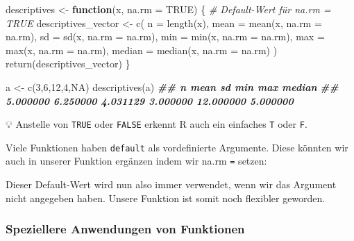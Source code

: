 \documentclass[
]{article}
\newenvironment{Shaded}{\begin{snugshade}}{\end{snugshade}}
\newcommand{\AttributeTok}[1]{\textcolor[rgb]{0.77,0.63,0.00}{#1}}
\newcommand{\CommentTok}[1]{\textcolor[rgb]{0.56,0.35,0.01}{\textit{#1}}}
\newcommand{\ConstantTok}[1]{\textcolor[rgb]{0.00,0.00,0.00}{#1}}
\newcommand{\ControlFlowTok}[1]{\textcolor[rgb]{0.13,0.29,0.53}{\textbf{#1}}}
\newcommand{\DecValTok}[1]{\textcolor[rgb]{0.00,0.00,0.81}{#1}}
\newcommand{\DocumentationTok}[1]{\textcolor[rgb]{0.56,0.35,0.01}{\textbf{\textit{#1}}}}
\newcommand{\FunctionTok}[1]{\textcolor[rgb]{0.00,0.00,0.00}{#1}}
\newcommand{\NormalTok}[1]{#1}
\newcommand{\OtherTok}[1]{\textcolor[rgb]{0.56,0.35,0.01}{#1}}
\begin{document}
\begin{Shaded}
\begin{Highlighting}[]
\NormalTok{descriptives }\OtherTok{\textless{}{-}} \ControlFlowTok{function}\NormalTok{(x, }\AttributeTok{na.rm =} \ConstantTok{TRUE}\NormalTok{) \{ }\CommentTok{\# Default{-}Wert für \textquotesingle{}na.rm\textquotesingle{} = TRUE}
\NormalTok{  descriptives\_vector }\OtherTok{\textless{}{-}} \FunctionTok{c}\NormalTok{(}
    \AttributeTok{n =} \FunctionTok{length}\NormalTok{(x),}
    \AttributeTok{mean =} \FunctionTok{mean}\NormalTok{(x, }\AttributeTok{na.rm =}\NormalTok{ na.rm), }
    \AttributeTok{sd =} \FunctionTok{sd}\NormalTok{(x, }\AttributeTok{na.rm =}\NormalTok{ na.rm),     }
    \AttributeTok{min =} \FunctionTok{min}\NormalTok{(x, }\AttributeTok{na.rm =}\NormalTok{ na.rm),   }
    \AttributeTok{max =} \FunctionTok{max}\NormalTok{(x, }\AttributeTok{na.rm =}\NormalTok{ na.rm),}
    \AttributeTok{median =} \FunctionTok{median}\NormalTok{(x, }\AttributeTok{na.rm =}\NormalTok{ na.rm)}
\NormalTok{  )}
  \FunctionTok{return}\NormalTok{(descriptives\_vector)}
\NormalTok{\}}

\NormalTok{a }\OtherTok{\textless{}{-}} \FunctionTok{c}\NormalTok{(}\DecValTok{3}\NormalTok{,}\DecValTok{6}\NormalTok{,}\DecValTok{12}\NormalTok{,}\DecValTok{4}\NormalTok{,}\ConstantTok{NA}\NormalTok{)}
\FunctionTok{descriptives}\NormalTok{(a)}
\DocumentationTok{\#\#         n      mean        sd       min       max    median }
\DocumentationTok{\#\#  5.000000  6.250000  4.031129  3.000000 12.000000  5.000000}
\end{Highlighting}
\end{Shaded}

💡 Anstelle von \texttt{TRUE} oder \texttt{FALSE} erkennt R auch ein einfaches \texttt{T} oder \texttt{F}.

Viele Funktionen haben \texttt{default} als vordefinierte Argumente. Diese könnten wir auch in unserer Funktion ergänzen indem wir na.rm \texttt{=} setzen:

Dieser Default-Wert wird nun also immer verwendet, wenn wir das Argument nicht angegeben haben. Unsere Funktion ist somit noch flexibler geworden.

\hypertarget{speziellere-anwendungen-von-funktionen}{%
\subsubsection{Speziellere Anwendungen von Funktionen}\label{speziellere-anwendungen-von-funktionen}}
\end{document}
